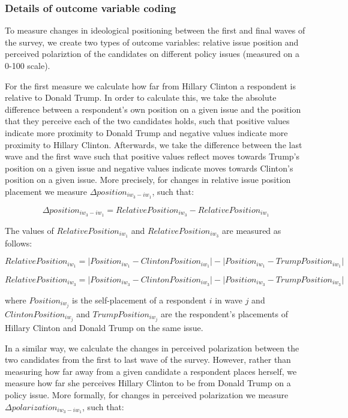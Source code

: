 \documentclass[
  12pt,
]{article}
\begin{document}
\hypertarget{details-of-outcome-variable-coding}{%
\subsubsection{Details of outcome variable coding}\label{details-of-outcome-variable-coding}}

To measure changes in ideological positioning between the first and final waves of the survey, we create two types of outcome variables: relative issue position and perceived polariztion of the candidates on different policy issues (measured on a 0-100 scale).

For the first measure we calculate how far from Hillary Clinton a respondent is relative to Donald Trump. In order to calculate this, we take the absolute difference between a respondent's own position on a given issue and the position that they perceive each of the two candidates holds, such that positive values indicate more proximity to Donald Trump and negative values indicate more proximity to Hillary Clinton. Afterwards, we take the difference between the last wave and the first wave such that positive values reflect moves towards Trump's position on a given issue and negative values indicate moves towards Clinton's position on a given issue. More precisely, for changes in relative issue position placement we measure \(\Delta position_{{iw_{3}}-{iw_{1}}}\), such that:

\[\Delta position_{{iw_{3}}-{iw_{1}}} = RelativePosition_{iw_{3}} - RelativePosition_{iw_{1}}\]

The values of \(RelativePosition_{iw_{1}}\) and \(RelativePosition_{iw_{3}}\) are measured as follows:

\[RelativePosition_{iw_{1}} = \lvert Position_{iw_{1}} - ClintonPosition_{iw_{1}} \rvert - \lvert Position_{iw_{1}} - TrumpPosition_{iw_{1}} \rvert \]

\[RelativePosition_{iw_{3}} = \lvert Position_{iw_{3}} - ClintonPosition_{iw_{3}} \rvert - \lvert Position_{iw_{3}} - TrumpPosition_{iw_{3}} \rvert \]

where \(Position_{iw_{j}}\) is the self-placement of a respondent \(i\) in wave \(j\) and \(ClintonPosition_{iw_{j}}\) and \(TrumpPosition_{iw_{j}}\) are the respondent's placements of Hillary Clinton and Donald Trump on the same issue.

In a similar way, we calculate the changes in perceived polarization between the two candidates from the first to last wave of the survey. However, rather than measuring how far away from a given candidate a respondent places herself, we measure how far she perceives Hillary Clinton to be from Donald Trump on a policy issue. More formally, for changes in perceived polarization we measure \(\Delta polarization_{{iw_{3}}-{iw_{1}}}\), such that:
\end{document}
